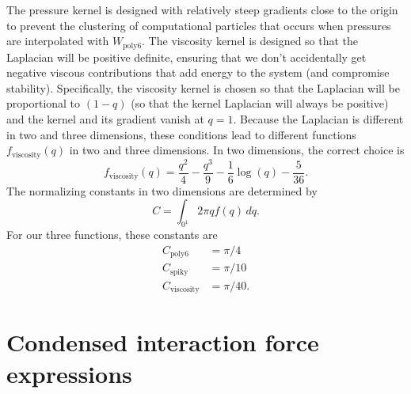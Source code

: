 \documentclass[10pt, leqno]{article} %
\newcommand{\Wps}{W_{\mathrm{poly6}}}
\newcommand{\fWvi}{f_{\mathrm{viscosity}}}
\begin{document}
The pressure kernel is designed with relatively steep gradients close
to the origin to prevent the clustering of computational particles
that occurs when pressures are interpolated with $\Wps$.  The
viscosity kernel is designed so that the Laplacian will be positive
definite, ensuring that we don't accidentally get negative viscous
contributions that add energy to the system (and compromise
stability).  Specifically, the viscosity kernel is chosen so that the
Laplacian will be proportional to $(1-q)$ (so that the kernel
Laplacian will always be positive) and the kernel and its gradient
vanish at $q = 1$.  Because the Laplacian is different in two and
three dimensions, these conditions lead to different functions
$\fWvi(q)$ in two and three dimensions.  In two dimensions, the
correct choice is
\[
  \fWvi(q) = 
    \frac{q^2}{4} - \frac{q^3}{9} - \frac{1}{6} \log(q) -\frac{5}{36}.
\]
The normalizing constants in two dimensions are determined by
\[
  C = \int_{0^1} 2\pi q f(q) \, dq.
\]
For our three functions, these constants are
\begin{align*}
C_{\mathrm{poly6}} &= \pi/4 \\
C_{\mathrm{spiky}} &= \pi/10 \\
C_{\mathrm{viscosity}} &= \pi/40.
\end{align*}

\section{Condensed interaction force expressions}
\end{document}
